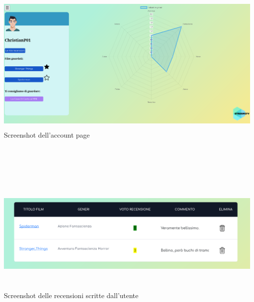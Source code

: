 \documentclass[12pt]{article}
\begin{document}
\begin{center}
		\centering \includegraphics[width=15cm, height=7cm]{Immagini/Account_screen.png} \\
		\centering Screenshot dell'account page ~\\ ~\\ ~\\ ~\\ ~\\
		
		\centering \includegraphics[width=15cm, height=6cm]{Immagini/User_reviews_screen.png} \\
		\centering Screenshot delle recensioni scritte dall'utente
	\end{center}
	\pagebreak
	
	
	
\end{document}
